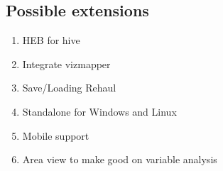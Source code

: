 	\subsection{Possible extensions} %
	\label{sub:possible_extensions}
	\begin{enumerate}
		\item HEB for hive
		\item Integrate vizmapper
		\item Save/Loading Rehaul
		\item Standalone for Windows and Linux
		\item Mobile support
		\item Area view to make good on variable analysis
	\end{enumerate}

	